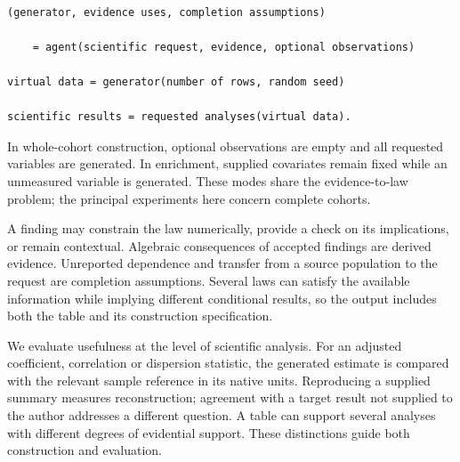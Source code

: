 \documentclass[sigconf,anonymous,review]{acmart}
\begin{document}
\noindent\begin{minipage}{\columnwidth}

\begin{lstlisting}

(generator, evidence uses, completion assumptions)

    = agent(scientific request, evidence, optional observations)

virtual data = generator(number of rows, random seed)

scientific results = requested analyses(virtual data).

\end{lstlisting}

\end{minipage}

In whole-cohort construction, optional observations are empty and all requested variables are generated. In enrichment, supplied covariates remain fixed while an unmeasured variable is generated. These modes share the evidence-to-law problem; the principal experiments here concern complete cohorts.


A finding may constrain the law numerically, provide a check on its implications, or remain contextual. Algebraic consequences of accepted findings are derived evidence. Unreported dependence and transfer from a source population to the request are completion assumptions. Several laws can satisfy the available information while implying different conditional results, so the output includes both the table and its construction specification.


We evaluate usefulness at the level of scientific analysis. For an adjusted coefficient, correlation or dispersion statistic, the generated estimate is compared with the relevant sample reference in its native units. Reproducing a supplied summary measures reconstruction; agreement with a target result not supplied to the author addresses a different question. A table can support several analyses with different degrees of evidential support. These distinctions guide both construction and evaluation.
\end{document}
